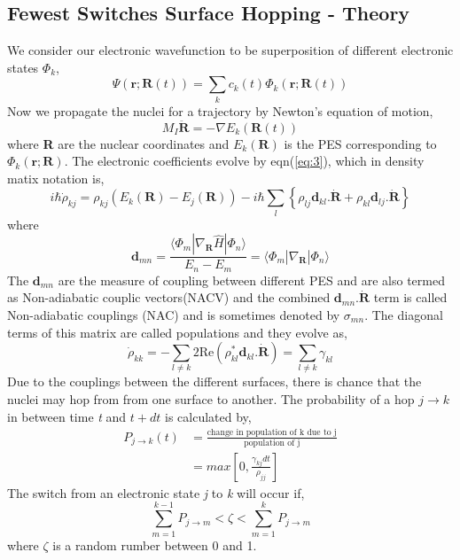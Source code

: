 \documentclass[12pt]{article}
\begin{document}
\subsection{Fewest Switches Surface Hopping - Theory}
We consider our electronic wavefunction to be superposition of different electronic states $\Phi_k$, 
\begin{equation}\label{eq:7}
\Psi(\textbf{r};\textbf{R}(t)) = \sum_kc_k(t)\Phi_k(\textbf{r};\textbf{R}(t)) 
\end{equation}
Now we propagate the nuclei for a trajectory by Newton's equation of motion,
\begin{equation}\label{eq:8}
M_I\ddot{\textbf{R}} = -\nabla E_k(\textbf{R}(t))
\end{equation}
where \textbf{R} are the nuclear coordinates and $E_k(\textbf{R})$ is the PES corresponding to $\Phi_k(\textbf{r};\textbf{R})$. The electronic coefficients evolve by eqn(\ref{eq:3}), which in density matix notation is,
\begin{equation}\label{eq:9}
i\hbar\dot{\rho}_{kj} = \rho_{kj}(E_k(\textbf{R})-E_j(\textbf{R})) - i\hbar \sum_l\left\lbrace\rho_{lj}\textbf{d}_{kl}\textbf{.}\dot{\textbf{R}} + \rho_{kl}\textbf{d}_{lj}\textbf{.}\dot{\textbf{R}}\right\rbrace
\end{equation}
where
\begin{equation}\label{eq:10}
\textbf{d}_{mn} = \frac{\langle\Phi_m|\nabla_\textbf{R}\hat{H}|\Phi_n\rangle}{E_n-E_m} = \langle\Phi_m|\nabla_\textbf{R}|\Phi_n\rangle
\end{equation}
The $\textbf{d}_{mn}$ are the measure of coupling between different PES and are also termed as Non-adiabatic couplic vectors(NACV) and the combined $\textbf{d}_{mn}\textbf{.}\dot{\textbf{R}}$ term is called Non-adiabatic couplings (NAC) and is sometimes denoted by $\sigma_{mn}$. The diagonal terms of this matrix are called populations and they evolve as,
\begin{equation}\label{eq:11}
\dot{\rho}_{kk} = -\sum_{l \neq k}2\text{Re}(\rho_{kl}^*\textbf{d}_{kl}\textbf{.}\dot{\textbf{R}}) = \sum_{l\neq k}\gamma_{kl}
\end{equation}
Due to the couplings between the different surfaces, there is chance that the nuclei may hop from from one surface to another. The probability of a hop $j\rightarrow k$ in between time \textit{t} and $t+dt$ is calculated by,
\begin{equation}\label{eq:12}
\begin{split}
P_{j\rightarrow k}(t) &= \frac{\text{change in population of k due to j}}{\text{population of j}}\\
&= max\left[0,\frac{\gamma_{kj}dt}{\rho_{jj}}\right]
\end{split}
\end{equation} 
The switch from an electronic state \textit{j} to \textit{k} will occur if,
\begin{equation}\label{eq:13}
\sum_{m=1}^{k-1}P_{j\rightarrow m} < \zeta <  \sum_{m=1}^{k}P_{j\rightarrow m}
\end{equation}
where $\zeta$ is a random rumber between 0 and 1.
 
\end{document}
